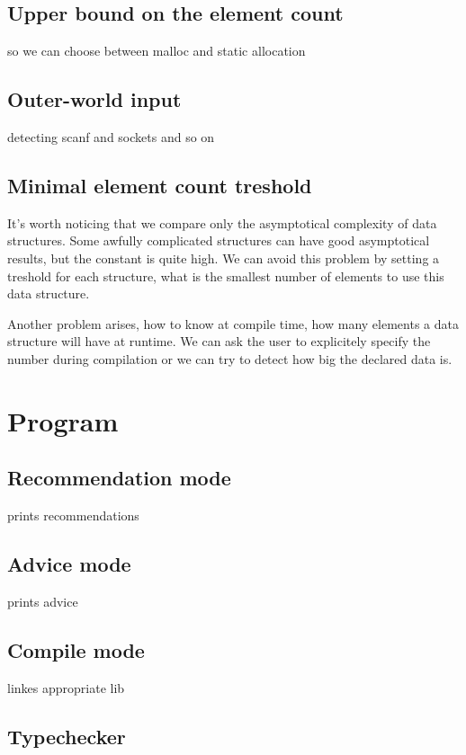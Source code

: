 \documentclass[11pt]{article}
\begin{document}
	\subsection{Upper bound on the element count}
		so we can choose between malloc and static allocation
	\subsection{Outer-world input}
		detecting scanf and sockets and so on
	\subsection{Minimal element count treshold}
		It's worth noticing that we compare only the asymptotical complexity of data structures. Some awfully complicated structures can have good asymptotical results, but the constant is quite high. We can avoid this problem by setting a treshold for each structure, what is the smallest number of elements to use this data structure. 

		Another problem arises, how to know at compile time, how many elements a data structure will have at runtime. We can ask the user to explicitely specify the number during compilation or we can try to detect how big the declared data is.
\section{Program}
	\subsection{Recommendation mode}
		prints recommendations 
	\subsection{Advice mode}
		prints advice
	\subsection{Compile mode}
		linkes appropriate lib
	\subsection{Typechecker}
\end{document}
